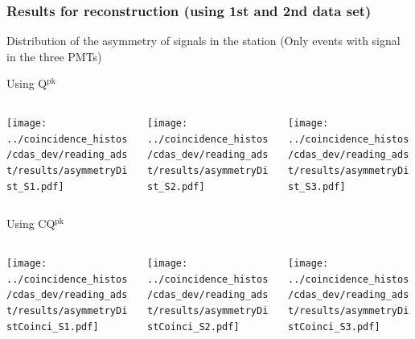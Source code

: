 \documentclass[aspectratio=169]{beamer}
\begin{document}
\begin{frame}
  \frametitle{Results for reconstruction (using 1st and 2nd data
  set)}
  Distribution of the asymmetry of signals in the station
  (Only events with signal in the three PMTs)
  \vspace{0.3cm}

  Using Q$^{\mathrm{pk}}$
  \begin{columns}
    \centering
    \begin{column}{0.33\textwidth}
      \texttt{[image: ../coincidence\_histos/cdas\_dev/reading\_adst/results/asymmetryDist\_S1.pdf]}
    \end{column}
    \begin{column}{0.33\textwidth}
      \texttt{[image: ../coincidence\_histos/cdas\_dev/reading\_adst/results/asymmetryDist\_S2.pdf]}
    \end{column}
    \begin{column}{0.33\textwidth}
      \texttt{[image: ../coincidence\_histos/cdas\_dev/reading\_adst/results/asymmetryDist\_S3.pdf]}
    \end{column}
  \end{columns}
  \vspace{0.2cm}

  Using CQ$^{\mathrm{pk}}$
  \begin{columns}
    \centering
    \begin{column}{0.33\textwidth}
      \texttt{[image: ../coincidence\_histos/cdas\_dev/reading\_adst/results/asymmetryDistCoinci\_S1.pdf]}
    \end{column}
    \begin{column}{0.33\textwidth}
      \texttt{[image: ../coincidence\_histos/cdas\_dev/reading\_adst/results/asymmetryDistCoinci\_S2.pdf]}
    \end{column}
    \begin{column}{0.33\textwidth}
      \texttt{[image: ../coincidence\_histos/cdas\_dev/reading\_adst/results/asymmetryDistCoinci\_S3.pdf]}
    \end{column}
  \end{columns}
\end{frame}
\end{document}
